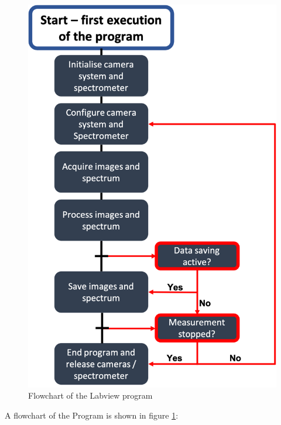 \begin{figure}
\begin{center}
\includegraphics[width=12cm]{Pictures/MainVI}
\caption[Flowchart of the LabVIEW program]{Flowchart of the Labview program}
\label{MainVI}
\end{center}
\end{figure}

A flowchart of the Program is shown in figure \ref{MainVI}:

